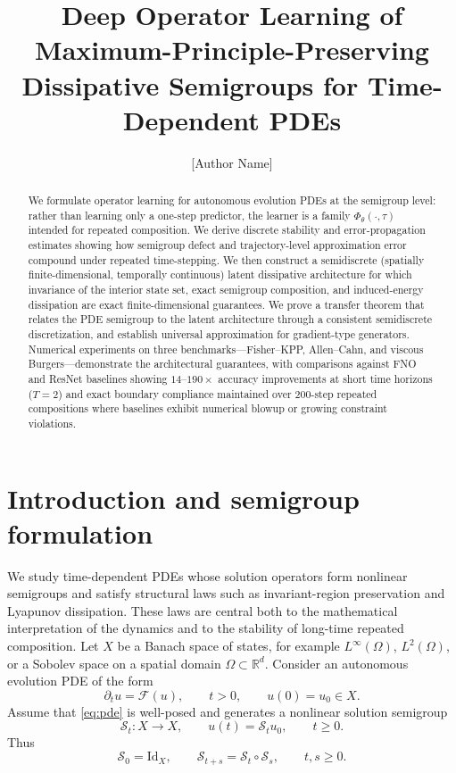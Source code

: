 \documentclass[11pt]{article}
\title{Deep Operator Learning of Maximum-Principle-Preserving Dissipative Semigroups for Time-Dependent PDEs}
\author{[Author Name]}
\date{}
\newcommand{\R}{\mathbb{R}}
\newcommand{\cS}{\mathcal{S}}
\newcommand{\cF}{\mathcal{F}}
\begin{document}
\maketitle

\begin{abstract}
We formulate operator learning for autonomous evolution PDEs at the semigroup level: rather than learning only a one-step predictor, the learner is a family \(\Phi_{\theta}(\cdot,\tau)\) intended for repeated composition. We derive discrete stability and error-propagation estimates showing how semigroup defect and trajectory-level approximation error compound under repeated time-stepping. We then construct a semidiscrete (spatially finite-dimensional, temporally continuous) latent dissipative architecture for which invariance of the interior state set, exact semigroup composition, and induced-energy dissipation are exact finite-dimensional guarantees. We prove a transfer theorem that relates the PDE semigroup to the latent architecture through a consistent semidiscrete discretization, and establish universal approximation for gradient-type generators. Numerical experiments on three benchmarks---Fisher--KPP, Allen--Cahn, and viscous Burgers---demonstrate the architectural guarantees, with comparisons against FNO and ResNet baselines showing $14$--$190\times$ accuracy improvements at short time horizons ($T=2$) and exact boundary compliance maintained over $200$-step repeated compositions where baselines exhibit numerical blowup or growing constraint violations.
\end{abstract}

\section{Introduction and semigroup formulation}
We study time-dependent PDEs whose solution operators form nonlinear semigroups and satisfy structural laws such as invariant-region preservation and Lyapunov dissipation. These laws are central both to the mathematical interpretation of the dynamics and to the stability of long-time repeated composition. Let \(X\) be a Banach space of states, for example \(L^{\infty}(\Omega)\), \(L^2(\Omega)\), or a Sobolev space on a spatial domain \(\Omega\subset \R^d\). Consider an autonomous evolution PDE of the form
\begin{equation}\label{eq:pde}
\partial_t u = \cF(u), \qquad t>0, \qquad u(0)=u_0\in X.
\end{equation}
Assume that \eqref{eq:pde} is well-posed \cite{CrandallLiggett1971} and generates a nonlinear solution semigroup
\begin{equation}\label{eq:semigroup-family}
\cS_t : X \to X, \qquad u(t)=\cS_tu_0, \qquad t\ge 0.
\end{equation}
Thus
\begin{equation}\label{eq:semigroup-law}
\cS_0 = \mathrm{Id}_X, \qquad \cS_{t+s}=\cS_t\circ \cS_s, \qquad t,s\ge 0.
\end{equation}
\end{document}
